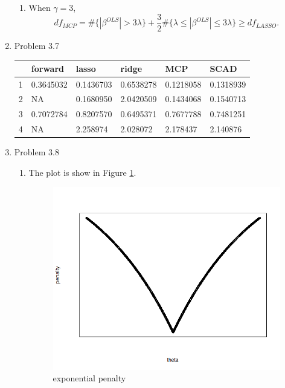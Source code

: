 \documentclass{article}
\begin{document}
\begin{enumerate}
\begin{enumerate}
\item 
When $\gamma = 3$, 
$$
df_{MCP} = \#\{|\beta^{OLS}| > 3\lambda\} +\frac{3}{2} \#\{\lambda \le |\beta^{OLS}| \le 3\lambda\} \ge df_{LASSO}.
$$

\end{enumerate}

\item Problem 3.7

\begin{table}[h]
\centering
\begin{tabular}{|l|l|l|l|l|l|}
\hline
  & forward   & lasso     & ridge     & MCP       & SCAD      \\ \hline
1 & 0.3645032 & 0.1436703 & 0.6538278 & 0.1218058 & 0.1318939 \\ \hline
2 & NA        & 0.1680950 & 2.0420509 & 0.1434068 & 0.1540713 \\ \hline
3 & 0.7072784 & 0.8207570 & 0.6495371 & 0.7677788 & 0.7481251 \\ \hline
4 & NA        & 2.258974  & 2.028072  & 2.178437  & 2.140876  \\ \hline
\end{tabular}
\end{table}



\item Problem 3.8

\begin{enumerate}
\item The plot is show in Figure \ref{3.8}.
\begin{figure}[h]
\centering
\includegraphics[scale=0.5]{exponential_penalty.png}
\caption{exponential penalty}
\label{3.8}
\end{figure}


\end{enumerate}
\end{enumerate}
\end{document}
